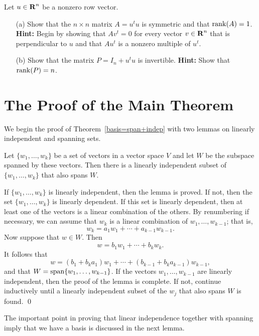 \documentclass{ximera}
\begin{document}
\begin{exercise} \label{c5.5.7}
Let $u\in\mbox{$\bf{R}$}^n$ be a nonzero row vector.
\begin{itemize}
\item[(a)]  Show that the $n\times n$ matrix $A=u^tu$ is symmetric and that
${\rm rank}(A)=1$.  {\bf Hint:}  Begin by showing that $Av^t=0$ for every vector
$v\in\mbox{$\bf{R}$}^n$ that is perpendicular to $u$ and that $Au^t$ is a nonzero multiple
of $u^t$.
\item[(b)]  Show that the matrix $P=I_n+u^tu$ is invertible.  {\bf Hint:}
Show that ${\rm rank}(P)=n$.
\end{itemize}
\end{exercise}


\section{The Proof of the Main Theorem} \label{S:5.6}

We begin the proof of Theorem~\ref{basis=span+indep} with two
lemmas on linearly independent and spanning sets.

\begin{lemma}  \label{reducetoindep}
Let $\{w_1,\ldots,w_k\}$ be a set of vectors in a vector space
$V$ and let $W$ be the subspace spanned by these vectors.  Then
there is a linearly independent subset of $\{w_1,\ldots,w_k\}$
that also spans $W$.
\end{lemma}

\proof If $\{w_1,\ldots,w_k\}$ is linearly independent, then the
lemma is proved.  If not, then the set $\{w_1,\ldots,w_k\}$ is
linearly dependent.  If this set is linearly dependent, then at
least one of the vectors is a linear combination of the others.
By renumbering if necessary, we can assume that $w_k$ is a
linear combination of $w_1,\ldots,w_{k-1}$; that is,
\[
w_k = a_1w_1 + \cdots + a_{k-1}w_{k-1}.
\]
Now suppose that $w\in W$.  Then
\[
w = b_1w_1 + \cdots + b_kw_k.
\]
It follows that
\[
w = (b_1+b_ka_1)w_1 + \cdots + (b_{k-1}+b_ka_{k-1})w_{k-1},
\]
and that $W={\rm span}\{w_1,\ldots,w_{k-1}\}$.  If the vectors
$w_1,\ldots,w_{k-1}$ are linearly independent, then the proof of
the lemma is complete.  If not, continue inductively until a
linearly independent subset of the $w_j$ that also spans $W$ is
found.  \qed

The important point in proving that linear independence together
with spanning imply that we have a basis is discussed in the next
lemma.
\end{document}
